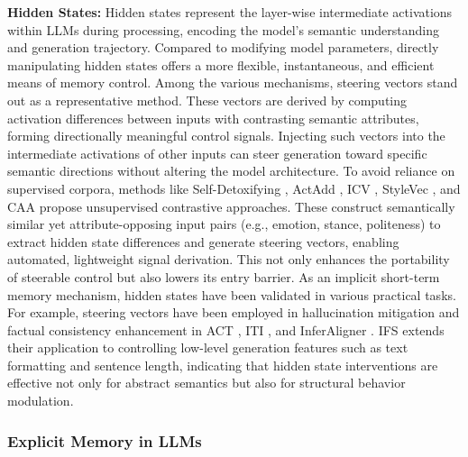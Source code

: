 \documentclass[]{memtensor}
\begin{document}
\textbf{Hidden States:}  
Hidden states represent the layer-wise intermediate activations within LLMs during processing, encoding the model's semantic understanding and generation trajectory. Compared to modifying model parameters, directly manipulating hidden states offers a more flexible, instantaneous, and efficient means of memory control.
Among the various mechanisms, steering vectors \cite{subramani_steerno1_2022} stand out as a representative method. These vectors are derived by computing activation differences between inputs with contrasting semantic attributes, forming directionally meaningful control signals. Injecting such vectors into the intermediate activations of other inputs can steer generation toward specific semantic directions without altering the model architecture.
To avoid reliance on supervised corpora, methods like Self-Detoxifying \cite{leong_selfdetoxifying_2023}, ActAdd \cite{turner_ActAdd_2024}, ICV \cite{liu_ICV_2024}, StyleVec \cite{konen_stylevec_2024}, and CAA \cite{rimsky_CAA_2024} propose unsupervised contrastive approaches. These construct semantically similar yet attribute-opposing input pairs (e.g., emotion, stance, politeness) to extract hidden state differences and generate steering vectors, enabling automated, lightweight signal derivation. This not only enhances the portability of steerable control but also lowers its entry barrier.
As an implicit short-term memory mechanism, hidden states have been validated in various practical tasks. For example, steering vectors have been employed in hallucination mitigation and factual consistency enhancement in ACT \cite{wang_ACT_2025}, ITI \cite{li_ITI_2023}, and InferAligner \cite{wang_inferaligner_2024}. IFS \cite{stolfo_IFS_2025} extends their application to controlling low-level generation features such as text formatting and sentence length, indicating that hidden state interventions are effective not only for abstract semantics but also for structural behavior modulation.

\subsubsection{Explicit Memory in LLMs}
\end{document}
